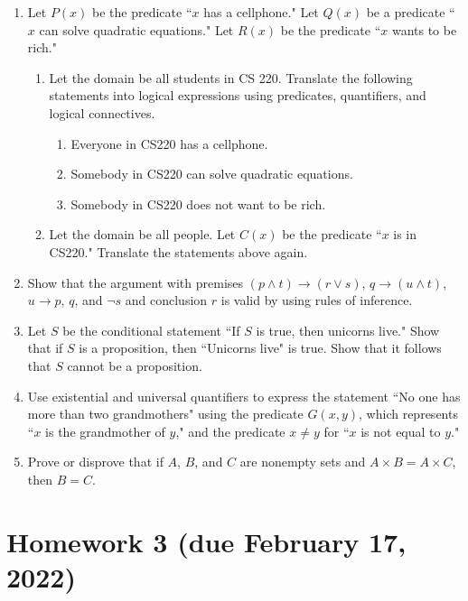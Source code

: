 \documentclass[letterpaper, 12pt]{article}
\begin{document}
\begin{enumerate}
    \item Let $P(x)$ be the predicate ``$x$ has a cellphone." Let $Q(x)$ be a predicate ``$x$ can solve quadratic equations." Let $R(x)$ be the predicate ``$x$ wants to be rich."
    \begin{enumerate}
        \item Let the domain be all students in CS 220. Translate the following statements into logical expressions using predicates, quantifiers, and logical connectives.
        \begin{enumerate}
            \item Everyone in CS220 has a cellphone.
            \item Somebody in CS220 can solve quadratic equations.
            \item Somebody in CS220 does not want to be rich.
        \end{enumerate}
        \item Let the domain be all people. Let $C(x)$ be the predicate ``$x$ is in CS220." Translate the statements above again.
    \end{enumerate}
    \item Show that the argument with premises $(p \wedge t) \to (r \vee s)$, $q \to (u \wedge t)$, $u \to p$, $q$, and $\neg s$ and conclusion $r$ is valid by using rules of inference.
    \item Let $S$ be the conditional statement ``If $S$ is true, then unicorns live." Show that if $S$ is a proposition, then ``Unicorns live" is true. Show that it follows that $S$ cannot be a proposition.
    \item Use existential and universal quantifiers to express the statement ``No one has more than two grandmothers" using the predicate $G(x,y)$, which represents ``$x$ is the grandmother of $y$," and the predicate $x \neq y$ for ``$x$ is not equal to $y$."
    \item Prove or disprove that if $A$, $B$, and $C$ are nonempty sets and $A \times B = A \times C$, then $B = C$.
\end{enumerate}

\section*{Homework 3 (due February 17, 2022)}
\end{document}
